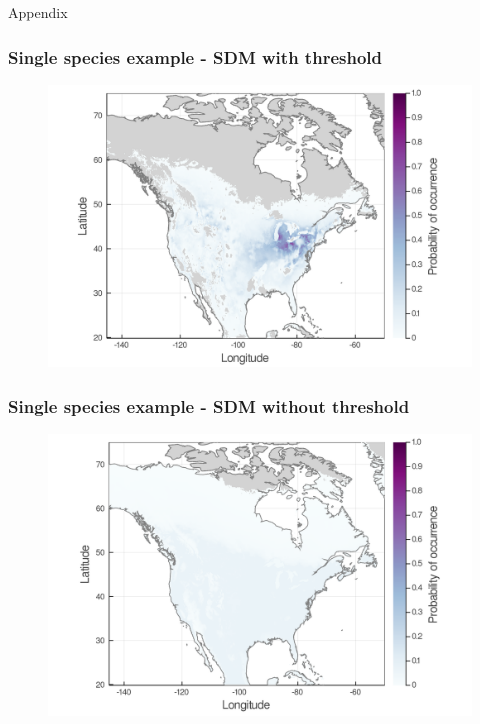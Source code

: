 \documentclass[10pt, aspectratio=1610]{beamer}
\begin{document}

\begin{frame}
  \vfill
  \centering
  \huge Appendix
  \vfill
\end{frame}

\begin{frame}
  \frametitle{Single species example - SDM with threshold}
  \begin{figure}
    \centering
    \hspace*{-0cm}\includegraphics[scale=0.17]{fig/01_sdm_singlesp-threshold.png}
  \end{figure}
\end{frame}

\begin{frame}
  \frametitle{Single species example - SDM without threshold}
  \begin{figure}
    \centering
    \hspace*{-0cm}\includegraphics[scale=0.17]{fig/01_sdm_singlesp.png}
  \end{figure}
\end{frame}
\end{document}

